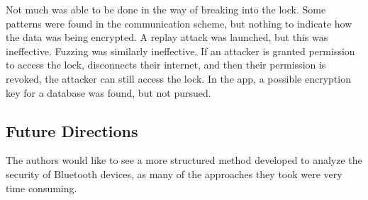 \documentclass[letterpaper,12pt]{article}
\begin{document}
\noindent
Not much was able to be done in the way of breaking into the lock. Some patterns were found in the communication scheme, but nothing to indicate how the data was being encrypted. A replay attack was launched, but this was ineffective. Fuzzing was similarly ineffective. If an attacker is granted permission to access the lock, disconnects their internet, and then their permission is revoked, the attacker can still access the lock. In the app, a possible encryption key for a database was found, but not pursued. 

\subsection{Future Directions}

\noindent
The authors would like to see a more structured method developed to analyze the security of Bluetooth devices, as many of the approaches they took were very time consuming. 


\end{document}
